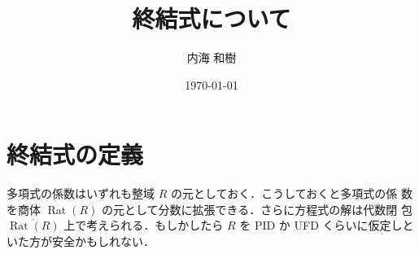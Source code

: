 \documentclass[12pt, uplatex, dvipdfmx]{jsarticle}
\theoremstyle{definition}
\DeclareMathOperator{\Rat}{Rat}
\begin{document}
\title{終結式について}
\author{内海 和樹}
\date{\today}
\maketitle

\newpage

\pagestyle{fancy}
\rhead{}
\lhead{}

\section{終結式の定義}

多項式の係数はいずれも整域 $R$ の元としておく．こうしておくと多項式の係
数を商体 $\Rat(R)$ の元として分数に拡張できる．さらに方程式の解は代数閉
包 $\overline{\Rat(R)}$ 上で考えられる．もしかしたら $R$ を PID か UFD
くらいに仮定しといた方が安全かもしれない．
\end{document}
